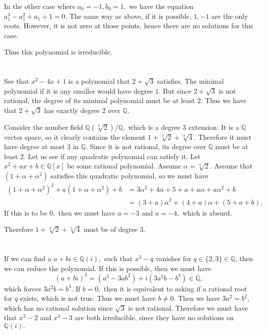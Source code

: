 \documentclass{article}
\begin{document}
In the other case where $a_0=-1, b_0=1,$ we have the equation $ a_1^3 -a_1^2 + a_1 +1=0.$ The same way as above, if it is possible, $1, -1$ are the only 
roots. However, it is not zero at those points, hence there are no solutions for this case. 

Thus this polynomial is irreducible.
\section{} %
See that $x^2-4x+1$ is a polynomial that $2 + \sqrt{3}$ satisfies. The minimal polynomial if it is any smaller would have degree $1.$ But since $2 + 
\sqrt{3}$ is not rational, the degree of its minimal polynomial must be at least $2.$ Thus we have that $2+\sqrt{3}$ has exactly degree $2$ over 
$\mathbb{Q}.$ 

Consider the number field $\mathbb{Q}(\sqrt[3]{2})/\mathbb{Q},$ which is a degree $3$ extension. It is a $\mathbb{Q}$ vector space, so it clearly contains 
the element $1 + \sqrt[3]{2} + \sqrt[3]{4}.$ Therefore it must have degree at most $3$ in $\mathbb{Q}.$ Since it is not rational, its degree over 
$\mathbb{Q}$ must be at least $2.$ Let us see if any quadratic polynomial can satisfy it. Let $x^2+ax+b \in \mathbb{Q}[x]$ be some rational polynomial. 
Assume $\alpha = \sqrt[3]{2}.$ Assume that $(1+ \alpha + \alpha^2)$ satisfies this quadratic polynomial, so we must have 
\begin{align*}
	(1+\alpha+\alpha^2)^2 + a (1+\alpha+\alpha^2) + b &= 3\alpha^2 + 4 \alpha + 5 + a + a\alpha + a\alpha^2 + b\\
	&= (3+a)\alpha^2 + (4+a)\alpha + (5+a+b). 
\end{align*}
If this is to be $0,$ then we must have $a=-3$ and $a=-4,$ which is absurd. 

Therefore $1 + \sqrt[3]{2} + \sqrt[3]{4}$ must be of degree $3.$
\section{} %
If we can find a $a+bi \in \mathbb{Q}(i),$ such that $x^3-q$ vanishes for $q \in \{2,3\} \in \mathbb{Q}$, then we can reduce the polynomial. If this is 
possible, then we must have $$ (a+bi)^3= (a^3-3ab^2) + i(3a^2b-b^3) \in \mathbb{Q},$$ which forces $3a^2b=b^3.$ If $b=0,$ then it is equivalent to asking if 
a rational root for  $q$ exists, which is not true. Thus we must have $b \neq 0.$ Then we have $3a^2=b^2,$ which has no rational solution since $\sqrt{3}$ 
is not rational. Therefore we must have that $x^3-2$ and $x^3-3$ are both irreducible, since they have no solutions on $\mathbb{Q}(i).$
\end{document}
